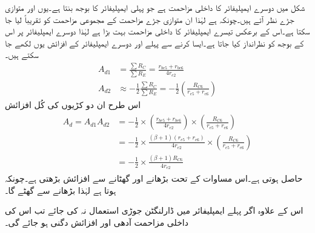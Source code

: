 شکل  میں دوسرے ایمپلیفائر کا داخلی مزاحمت  ہے جو پہلی ایمپلیفائر کا بوجھ بنتا ہے۔یوں  اور  متوازی جڑے نظر آتے ہیں۔چونکہ  ہے لہٰذا ان متوازی جڑے مزاحمت کے مجموعی مزاحمت کو تقریباً   لیا جا سکتا ہے۔اس کے برعکس تیسرے ایمپلیفائر کا داخلی مزاحمت بہت بڑا ہے لہٰذا دوسرے ایمپلیفائر پر اس کے بوجھ کو نظرانداز کیا جاتا ہے۔ایسا کرنے سے پہلے اور دوسرے ایمپلیفائر کے افزائش  یوں لکھے جا سکتے ہیں۔
\begin{align*}
A_{d1}&=\frac{\sum R_C}{\sum R_E}=\frac{r_{be5}+r_{be6}}{4 r_{e2}}\\
A_{d2}& \approx -\frac{1}{2}\frac{\sum R_C}{\sum R_E}=-\frac{1}{2} \left(\frac{R_{C6}}{r_{e5}+r_{e6}}\right)
\end{align*}
اس طرح ان دو کڑیوں کی کُل افزائش
\begin{gather}
\begin{aligned}
A_d=A_{d1} A_{d2}&=-\frac{1}{2}  \times \left(\frac{r_{be5}+r_{be6}}{4 r_{e2}}\right) \times \left(\frac{R_{C6}}{r_{e5}+r_{e6}}\right)\\
&=-\frac{1}{2}  \times \frac{\left(\beta+1 \right) \left(r_{e5}+r_{e6}\right)}{4 r_{e2}} \times \left(\frac{R_{C6}}{r_{e5}+r_{e6}}\right)\\
&=-\frac{1}{2}  \times \frac{\left(\beta+1 \right)R_{C6} }{4 r_{e2}}
\end{aligned}
\end{gather}
حاصل ہوتی ہے۔اس مساوات کے تحت   بڑھانے اور  گھٹانے سے افزائش بڑھتی ہے۔چونکہ  ہوتا ہے لہٰذا  بڑھانے سے  گھٹے گا۔

اس کے علاوہ اگر پہلے ایمپلیفائر میں ڈارلنگٹن جوڑی استعمال نہ کی جائے تب اس کی داخلی مزاحمت آدھی اور  افزائش دگنی ہو جائے گی۔

